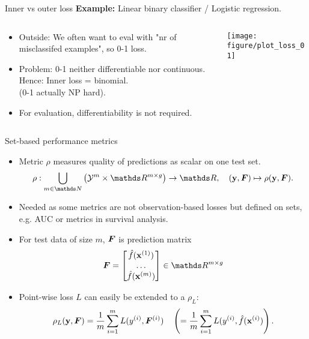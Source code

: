 \documentclass[11pt,compress,t,notes=noshow, xcolor=table]{beamer}
\begin{document}
\begin{vbframe}{Inner vs outer loss}
\textbf{Example:} Linear binary classifier / Logistic regression.
\begin{columns}
\begin{column}{0.7\textwidth}
\small
\begin{itemize}
  \item Outside: We often want to eval with "nr of misclassifed examples",
      so 0-1 loss.
  \item Problem: 0-1 neither differentiable nor continuous.
  Hence: Inner loss = binomial.\\
  (0-1 actually NP hard).
  \item For evaluation, differentiability is not required.
\end{itemize}
\end{column}
\begin{column}{0.3\textwidth}
\begin{center}    
  \texttt{[image: figure/plot\_loss\_01]}
\end{center}    
\end{column}
\end{columns}


\end{vbframe}





\begin{vbframe}{Set-based performance metrics}
\begin{itemize}
  \item Metric $\rho$ measures quality of predictions as scalar on one test set.
  $$\rho: \preimageRho  \rightarrow \R, \quad (\yv, \F) \mapsto \rho(\yv, \F).$$
  \item Needed as some metrics are not observation-based losses but defined on sets,
      e.g. AUC or metrics in survival analysis. 
  \item For test data of size $m$, $\bm{F}$ is prediction matrix 
$$\F = \begin{bmatrix} 
\fh(\xi[1]) \\ 
\dots \\
\fh(\xi[m])
\end{bmatrix} \in \R^{m \times g}$$ 
  \item Point-wise loss $L$ can easily be extended to a $\rho_L$:
  $$\rho_L(\mathbf{y}, \bm{F}) = \frac{1}{m}\sum\limits_{i=1}^m L(y^{(i)}, \bm{F}^{(i)})  \quad \left(= \frac{1}{m}\sum\limits_{i=1}^m L(y^{(i)}, \hat{f}(\mathbf{x}^{(i)})\right).$$
\end{itemize}
\end{vbframe}
\end{document}
